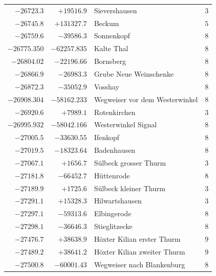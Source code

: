 \begin{center}
\begin{tabular}{r|r|p{170pt}|r}
\(-26723.3\)&\(+19516.9\)&Sievershausen&\(3\)\\
\(-26745.8\)&\(+131327.7\)&Beckum&\(5\)\\
\(-26759.6\)&\(-39586.3\)&Sonnenkopf&\(8\)\\
\(-26775.350\)&\(-62257.835\)&Kalte Thal&\(8\)\\
\(-26804.02\)&\(-22196.66\)&Bornsberg&\(8\)\\
\(-26866.9\)&\(-26983.3\)&Grube Neue Weinschenke&\(8\)\\
\(-26872.3\)&\(-35052.9\)&Vosshay&\(8\)\\
\(-26908.304\)&\(-58162.233\)&Wegweiser vor dem Westerwinkel&\(8\)\\
\(-26920.6\)&\(+7989.1\)&Rotenkirchen&\(3\)\\
\(-26995.932\)&\(-58042.166\)&Westerwinkel Signal&\(8\)\\
\(-27005.5\)&\(-33630.55\)&Ifenkopf&\(8\)\\
\(-27019.5\)&\(-18323.64\)&Badenhausen&\(8\)\\
\(-27067.1\)&\(+1656.7\)&Sülbeck grosser Thurm&\(3\)\\
\(-27181.8\)&\(-66452.7\)&Hüttenrode&\(8\)\\
\(-27189.9\)&\(+1725.6\)&Sülbeck kleiner Thurm&\(3\)\\
\(-27291.1\)&\(+15328.3\)&Hilwartshausen&\(3\)\\
\(-27297.1\)&\(-59313.6\)&Elbingerode&\(8\)\\
\(-27298.1\)&\(-36646.3\)&Stieglitzecke&\(8\)\\
\(-27476.7\)&\(+38638.9\)&Höxter Kilian erster Thurm&\(9\)\\
\(-27489.2\)&\(+38641.2\)&Höxter Kilian zweiter Thurm&\(9\)\\
\(-27500.8\)&\(-60001.43\)&Wegweiser nach Blankenburg&\(8\)\\
\hline\end{tabular}\endgroup\end{center}
